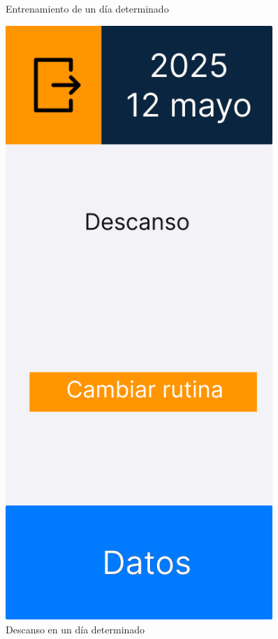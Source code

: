 \begin{figure}[H]
\begin{minipage}{0.45\textwidth}
      \caption{Entrenamiento de un día determinado}
      \label{fig:Entrenamiento de un día determinado}
   \end{minipage}%
   \hspace{0.5cm}
   \begin{minipage}{0.45\textwidth}
      \centering
      \includegraphics[width=0.9\textwidth]{fotos/Frame 27.png}
      \caption{Descanso en un día determinado}
      \label{fig:Descanso en un día determinado}
   \end{minipage}
\end{figure}

